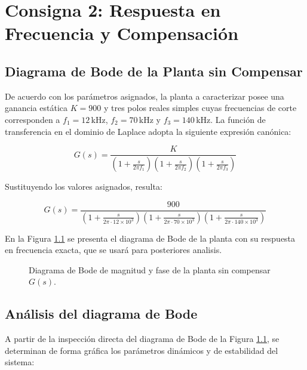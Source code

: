\chapter{Consigna 2: Respuesta en Frecuencia y Compensación}

\section{Diagrama de Bode de la Planta sin Compensar}

De acuerdo con los parámetros asignados, la planta a caracterizar posee una ganancia estática $K = 900$ y tres polos
reales simples cuyas frecuencias de corte corresponden a $f_1 = 12\,\si{\kilo\hertz}$, $f_2 = 70\,\si{\kilo\hertz}$ y
$f_3 = 140\,\si{\kilo\hertz}$. La función de transferencia en el dominio de Laplace adopta la siguiente expresión
canónica:

\begin{equation}
    G(s) = \frac{K}{\left(1 + \frac{s}{2\pi f_1}\right) \left(1 + \frac{s}{2\pi f_2}\right) \left(1 + \frac{s}{2\pi f_3}\right)}
    \label{eq.ej2:planta_simbolica}
\end{equation}

Sustituyendo los valores asignados, resulta:

\begin{equation}
    G(s) = \frac{900}{\left(1 + \frac{s}{2\pi \cdot 12 \times 10^3}\right) \left(1 + \frac{s}{2\pi \cdot 70 \times 10^3}\right) \left(1 + \frac{s}{2\pi \cdot 140 \times 10^3}\right)}
    \label{eq.ej2:planta_numerica}
\end{equation}

En la Figura \ref{fig.ej2:bode_planta} se presenta el diagrama de Bode de la planta con su respuesta en frecuencia
exacta, que se usará para posteriores analisis.

\begin{figure}[!ht]
    \centering
    
    \caption{Diagrama de Bode de magnitud y fase de la planta sin compensar $G(s)$.}
    \label{fig.ej2:bode_planta}
\end{figure}

\section{Análisis del diagrama de Bode}

A partir de la inspección directa del diagrama de Bode de la Figura \ref{fig.ej2:bode_planta}, se determinan de forma
gráfica los parámetros dinámicos y de estabilidad del sistema:


